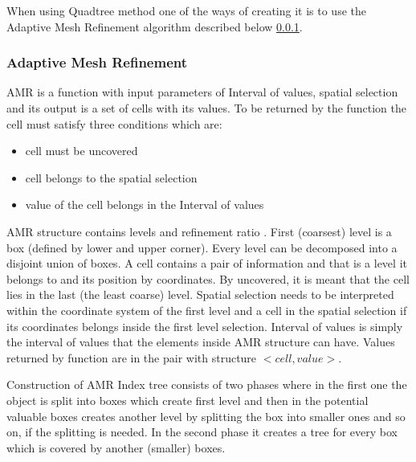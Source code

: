 When using Quadtree method one of the ways of creating it is to use the Adaptive Mesh Refinement algorithm described below \ref{AMR}.

\subsubsection{Adaptive Mesh Refinement}\label{AMR}
AMR is a function with input parameters of Interval of values, spatial selection and its output is a set of cells with its values. To be returned by the function the cell must satisfy three conditions which are:
\begin{itemize}
\item cell must be uncovered
\item cell belongs to the spatial selection
\item value of the cell belongs in the Interval of values
\end{itemize}
AMR structure contains levels and refinement ratio \cite{AMRindexing}. First (coarsest) level is a box (defined by lower and upper corner). Every level can be decomposed into a disjoint union of boxes. A cell contains a pair of information and that is a level it belongs to and its position by coordinates. By uncovered, it is meant that the cell lies in the last (the least coarse) level. Spatial selection needs to be interpreted within the coordinate system of the first level and a cell in the spatial selection if its coordinates belongs inside the first level selection. Interval of values is simply the interval of values that the elements inside AMR structure can have. Values returned by function are in the pair with structure $<cell, value>$.

Construction of AMR Index tree consists of two phases where in the first one the object is split into boxes which create first level and then in the potential valuable boxes creates another level by splitting the box into smaller ones and so on, if the splitting is needed. In the second phase it creates a tree for every box which is covered by another (smaller) boxes.

